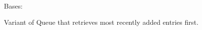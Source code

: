 \documentclass[letterpaper,10pt,english]{sphinxmanual}
\begin{document}
\begin{fulllineitems}
\label{\detokenize{queue:queue.LifoQueue}}
\pysigstartsignatures
{}
\pysigstopsignatures
\sphinxAtStartPar
Bases: {\hyperref[\detokenize{queue:queue.Queue}]{}}

\sphinxAtStartPar
Variant of Queue that retrieves most recently added entries first.

\end{fulllineitems}

\end{document}
